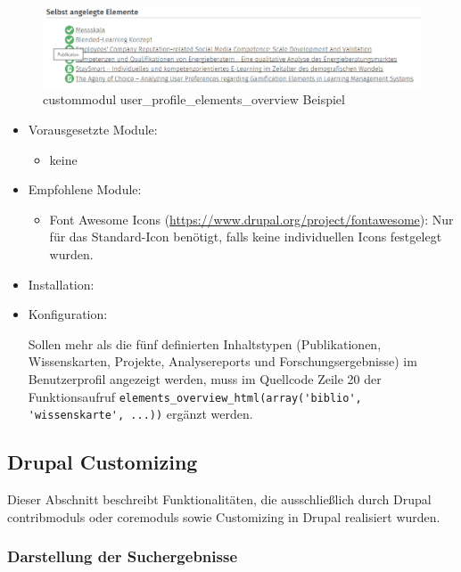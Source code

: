 \begin{figure}[H]
	\centering
	\includegraphics[width=0.80\linewidth]{images/example_userprofile}
	\caption{\gls{custommodul} user\_profile\_elements\_overview Beispiel}
	\label{fig:example_userprofile}
\end{figure}

\begin{itemize}[parsep=0pt, itemsep=5.0pt plus 2.0pt minus 1.0pt, leftmargin=*]
	\item Vorausgesetzte Module:
	\begin{itemize}
		\item keine
	\end{itemize}
	
	\item Empfohlene Module:
	\begin{itemize}
		\item Font Awesome Icons (\url{https://www.drupal.org/project/fontawesome}): Nur für das Standard-Icon benötigt, falls keine individuellen Icons festgelegt wurden.
	\end{itemize}
	
	\item Installation: \standardinstall
	
	
	\item Konfiguration:
	
	\noconfig
	
	Sollen mehr als die fünf definierten Inhaltstypen (Publikationen, Wissenskarten, Projekte, Analysereports und Forschungsergebnisse) im Benutzerprofil angezeigt werden, muss im Quellcode Zeile 20 der Funktionsaufruf \lstinline|elements_overview_html(array('biblio', 'wissenskarte', ...))| ergänzt werden.	
\end{itemize}



\newpage
\subsection{Drupal Customizing}\label{sub:drupal_customizing}
Dieser Abschnitt beschreibt Funktionalitäten, die ausschließlich durch Drupal \glspl{contribmodul} oder \glspl{coremodul} sowie Customizing in Drupal realisiert wurden.

\subsubsection{Darstellung der Suchergebnisse}\label{subsub:suchergebnisse}

